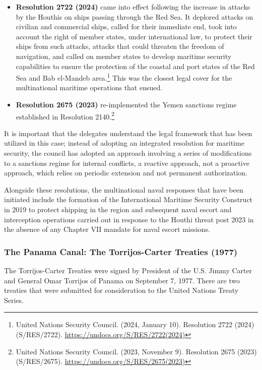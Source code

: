 \begin{itemize}
  \item \textbf{Resolution 2722 (2024)} came into effect following the increase in attacks by the Houthis on ships passing through the Red Sea. It deplored attacks on civilian and commercial ships, called for their immediate end, took into account the right of member states, under international law, to protect their ships from such attacks, attacks that could threaten the freedom of navigation, and called on member states to develop maritime security capabilities to ensure the protection of the coastal and port states of the Red Sea and Bab el-Mandeb area.\footnote{United Nations Security Council. (2024, January 10). Resolution 2722 (2024) (S/RES/2722). \url{https://undocs.org/S/RES/2722(2024)}} This was the closest legal cover for the multinational maritime operations that ensued.
  \item \textbf{Resolution 2675 (2023)} re-implemented the Yemen sanctions regime established in Resolution 2140.\footnote{United Nations Security Council. (2023, November 9). Resolution 2675 (2023) (S/RES/2675). \url{https://undocs.org/S/RES/2675(2023)}}
\end{itemize}

It is important that the delegates understand the legal framework that has been utilized in this case; instead of adopting an integrated resolution for maritime security, the council has adopted an approach involving a series of modifications to a sanctions regime for internal conflicts, a reactive approach, not a proactive approach, which relies on periodic extension and not permanent authorization.

Alongside these resolutions, the multinational naval responses that have been initiated include the formation of the International Maritime Security Construct in 2019 to protect shipping in the region and subsequent naval escort and interception operations carried out in response to the Houthi threat post 2023 in the absence of any Chapter VII mandate for naval escort missions.

\subsubsection{The Panama Canal: The Torrijos-Carter Treaties (1977)}

The Torrijos-Carter Treaties were signed by President of the U.S. Jimmy Carter and General Omar Torrijos of Panama on September 7, 1977. There are two treaties that were submitted for consideration to the United Nations Treaty Series.

